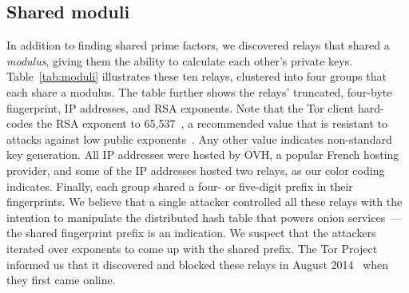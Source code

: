 \subsection{Shared moduli}
\label{sec:shared-moduli}
In addition to finding shared prime factors, we discovered relays that shared a
\emph{modulus}, giving them the ability to calculate each other's private keys.
Table~\ref{tab:moduli} illustrates these ten relays, clustered into four groups
that each share a modulus.  The table further shows the relays' truncated,
four-byte fingerprint, IP addresses, and RSA exponents.  Note that the Tor
client hard-codes the RSA exponent to 65,537~\cite[\S~0.3]{torspec}, a
recommended value that is resistant to attacks against low public
exponents~\cite[\S~4]{Boneh1999a}.  Any other value indicates non-standard key
generation.  All IP addresses were hosted by OVH, a popular French hosting
provider, and some of the IP addresses hosted two relays, as our color coding
indicates.  Finally, each group shared a four- or five-digit prefix in their
fingerprints.  We believe that a single attacker controlled all these relays
with the intention to manipulate the distributed hash table that powers onion
services~\cite{Biryukov2013a}---the shared fingerprint prefix is an indication.
We suspect that the attackers iterated over exponents to come up with the shared
prefix.  The Tor Project informed us that it discovered and blocked these relays
in August 2014~\cite{tor-priv1} when they first came online.

